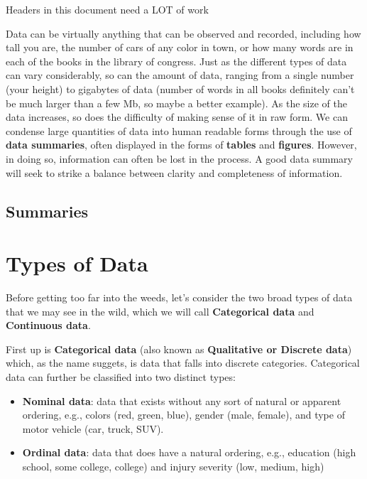 \documentclass[
]{book}
\theoremstyle{definition}
\theoremstyle{definition}
\theoremstyle{definition}
\theoremstyle{remark}
\begin{document}
Headers in this document need a LOT of work

Data can be virtually anything that can be observed and recorded, including how tall you are, the number of cars of any color in town, or how many words are in each of the books in the library of congress. Just as the different types of data can vary considerably, so can the amount of data, ranging from a single number (your height) to gigabytes of data (number of words in all books definitely can't be much larger than a few Mb, so maybe a better example). As the size of the data increases, so does the difficulty of making sense of it in raw form. We can condense large quantities of data into human readable forms through the use of \textbf{data summaries}, often displayed in the forms of \textbf{tables} and \textbf{figures}. However, in doing so, information can often be lost in the process. A good data summary will seek to strike a balance between clarity and completeness of information.

\hypertarget{summaries}{%
\subsection{Summaries}\label{summaries}}

\hypertarget{types-of-data}{%
\section{Types of Data}\label{types-of-data}}

Before getting too far into the weeds, let's consider the two broad types of data that we may see in the wild, which we will call \textbf{Categorical data} and \textbf{Continuous data}.

First up is \textbf{Categorical data} (also known as \textbf{Qualitative or Discrete data}) which, as the name suggets, is data that falls into discrete categories. Categorical data can further be classified into two distinct types:

\begin{itemize}
\item
  \textbf{Nominal data}: data that exists without any sort of natural or apparent ordering, e.g., colors (red, green, blue), gender (male, female), and type of motor vehicle (car, truck, SUV).
\item
  \textbf{Ordinal data}: data that does have a natural ordering, e.g., education (high school, some college, college) and injury severity (low, medium, high)
\end{itemize}
\end{document}
